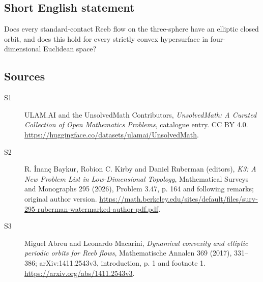 \documentclass[11pt]{article}
\begin{document}
\subsection{Short English statement}
Does every standard-contact Reeb flow on the three-sphere have an elliptic closed orbit, and does this hold for every strictly convex hypersurface in four-dimensional Euclidean space?
\subsection{Sources}
\begin{description}
\item[\hypertarget{source:statement:1}{S1}] ULAM.AI and the UnsolvedMath Contributors, \emph{UnsolvedMath: A Curated Collection of Open Mathematics Problems}, catalogue entry. CC BY 4.0. \url{https://huggingface.co/datasets/ulamai/UnsolvedMath}.
\item[\hypertarget{source:statement:2}{S2}] R. İnanç Baykur, Robion C. Kirby and Daniel Ruberman (editors), \emph{K3: A New Problem List in Low-Dimensional Topology}, Mathematical Surveys and Monographs 295 (2026), Problem 3.47, p. 164 and following remarks; original author version. \url{https://math.berkeley.edu/sites/default/files/surv-295-ruberman-watermarked-author-pdf.pdf}.
\item[\hypertarget{source:statement:3}{S3}] Miguel Abreu and Leonardo Macarini, \emph{Dynamical convexity and elliptic periodic orbits for Reeb flows}, Mathematische Annalen 369 (2017), 331--386; arXiv:1411.2543v3, introduction, p. 1 and footnote 1. \url{https://arxiv.org/abs/1411.2543v3}.
\end{description}
\label{end:statement}
\end{document}
